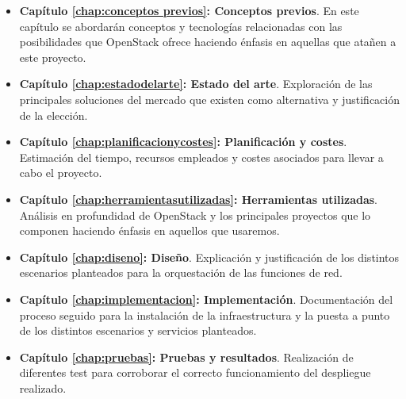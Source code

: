 \begin{itemize}
\item \textbf{Capítulo \ref{chap:conceptos previos}: Conceptos previos}. En este capítulo se abordarán conceptos y tecnologías relacionadas con las posibilidades que OpenStack ofrece haciendo énfasis en aquellas que atañen a este proyecto.
\end{itemize}

\begin{itemize}
\item \textbf{Capítulo \ref{chap:estadodelarte}: Estado del arte}. Exploración de las principales soluciones del mercado que existen como alternativa y justificación de la elección.
\end{itemize}

\begin{itemize}
\item \textbf{Capítulo \ref{chap:planificacionycostes}: Planificación y costes}. Estimación del tiempo, recursos empleados y costes asociados para llevar a cabo el proyecto.
\end{itemize}

\begin{itemize}
\item \textbf{Capítulo \ref{chap:herramientasutilizadas}: Herramientas utilizadas}. Análisis en profundidad de OpenStack y los principales proyectos que lo componen haciendo énfasis en aquellos que usaremos.
\end{itemize}

\begin{itemize}
\item \textbf{Capítulo \ref{chap:diseno}: Diseño}. Explicación y justificación de los distintos escenarios planteados para la orquestación de las funciones de red.
\end{itemize}

\begin{itemize}
\item \textbf{Capítulo \ref{chap:implementacion}: Implementación}. Documentación del proceso seguido para la instalación de la infraestructura y la puesta a punto de los distintos escenarios y servicios planteados.
\end{itemize}

\begin{itemize}
\item \textbf{Capítulo \ref{chap:pruebas}: Pruebas y resultados}. Realización de diferentes test para corroborar el correcto funcionamiento del despliegue realizado.
\end{itemize}


